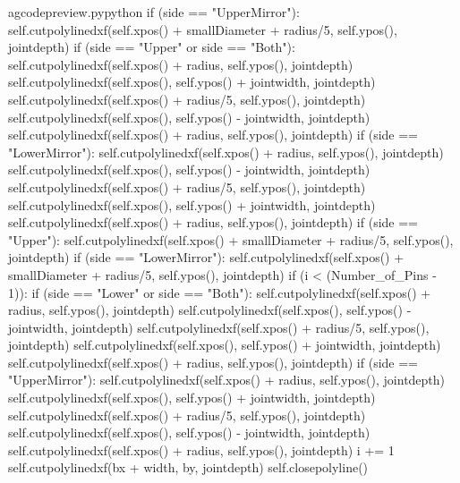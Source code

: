 \documentclass{ltxdoc}
\begin{document}
\begin{writecode}{a}{gcodepreview.py}{python}
                if (side == "UpperMirror"):
                    self.cutpolylinedxf(self.xpos() + smallDiameter + radius/5, self.ypos(), jointdepth)
                if (side == "Upper" or side == "Both"):
                    self.cutpolylinedxf(self.xpos() + radius, self.ypos(), jointdepth)
                    self.cutpolylinedxf(self.xpos(), self.ypos() + jointwidth, jointdepth)
                    self.cutpolylinedxf(self.xpos() + radius/5, self.ypos(), jointdepth)
                    self.cutpolylinedxf(self.xpos(), self.ypos() - jointwidth, jointdepth)
                    self.cutpolylinedxf(self.xpos() + radius, self.ypos(), jointdepth)
                if (side == "LowerMirror"):
                    self.cutpolylinedxf(self.xpos() + radius, self.ypos(), jointdepth)
                    self.cutpolylinedxf(self.xpos(), self.ypos() - jointwidth, jointdepth)
                    self.cutpolylinedxf(self.xpos() + radius/5, self.ypos(), jointdepth)
                    self.cutpolylinedxf(self.xpos(), self.ypos() + jointwidth, jointdepth)
                    self.cutpolylinedxf(self.xpos() + radius, self.ypos(), jointdepth)
                if (side == "Upper"):
                    self.cutpolylinedxf(self.xpos() + smallDiameter + radius/5, self.ypos(), jointdepth)
                if (side == "LowerMirror"):
                    self.cutpolylinedxf(self.xpos() + smallDiameter + radius/5, self.ypos(), jointdepth)
                if (i < (Number_of_Pins - 1)):
                    if (side == "Lower" or side == "Both"):
                        self.cutpolylinedxf(self.xpos() + radius, self.ypos(), jointdepth)
                        self.cutpolylinedxf(self.xpos(), self.ypos() - jointwidth, jointdepth)
                        self.cutpolylinedxf(self.xpos() + radius/5, self.ypos(), jointdepth)
                        self.cutpolylinedxf(self.xpos(), self.ypos() + jointwidth, jointdepth)
                        self.cutpolylinedxf(self.xpos() + radius, self.ypos(), jointdepth)
                    if (side == "UpperMirror"):
                        self.cutpolylinedxf(self.xpos() + radius, self.ypos(), jointdepth)
                        self.cutpolylinedxf(self.xpos(), self.ypos() + jointwidth, jointdepth)
                        self.cutpolylinedxf(self.xpos() + radius/5, self.ypos(), jointdepth)
                        self.cutpolylinedxf(self.xpos(), self.ypos() - jointwidth, jointdepth)
                        self.cutpolylinedxf(self.xpos() + radius, self.ypos(), jointdepth)
                i += 1
            self.cutpolylinedxf(bx + width, by, jointdepth)
        self.closepolyline()

\end{writecode}
\end{document}
